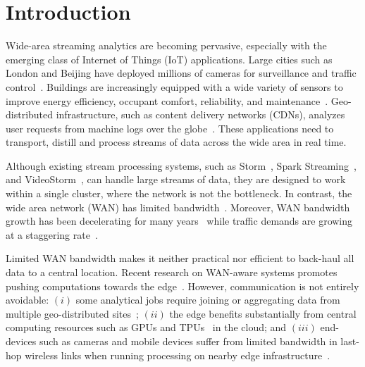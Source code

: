 \section{Introduction}

Wide-area streaming analytics are becoming pervasive, especially with the
emerging class of Internet of Things (IoT) applications.  Large cities such as
London and Beijing have deployed millions of cameras for surveillance and
traffic control~\cite{london.surveillance, skynet}. Buildings are increasingly
equipped with a wide variety of sensors to improve energy efficiency, occupant
comfort, reliability, and
maintenance~\cite{krioukov2012building}. Geo-distributed infrastructure, such as
content delivery networks (CDNs), analyzes user requests from machine logs over the
globe~\cite{mukerjee2015practical}. These applications need to transport,
distill and process streams of data across the wide area in real time.

Although existing stream processing systems, such as
Storm~\cite{toshniwal2014storm}, Spark Streaming~\cite{zaharia2013discretized},
and VideoStorm~\cite{zhang2017live}, can handle large streams of data, they are
designed to work within a single cluster, where the network is not the
bottleneck.  In contrast, the wide area network (WAN) has limited
bandwidth~\cite{hsieh17gaia, vulimiri2015global}. Moreover, WAN bandwidth growth
has been decelerating for many years~\cite{global2016telegeography} while
traffic demands are growing at a staggering rate~\cite{index2013zettabyte}.

Limited WAN bandwidth makes it neither practical nor efficient to back-haul all
data to a central location.  Recent research on WAN-aware systems promotes
pushing computations towards the edge~\cite{satyanarayanan2009case,
  rabkin2014aggregation, pu2015low}. However, communication is not entirely
avoidable: $(i)$ some analytical jobs require joining or aggregating data from
multiple geo-distributed sites~\cite{pu2015low, viswanathan2016clarinet}; $(ii)$
the edge benefits substantially from central computing resources such as GPUs
and TPUs~\cite{abadi2016tensorflow} in the cloud; and $(iii)$ end-devices such
as cameras and mobile devices suffer from limited bandwidth in last-hop wireless
links when running processing on nearby edge
infrastructure~\cite{zhang2015design, abari2017enabling}.


